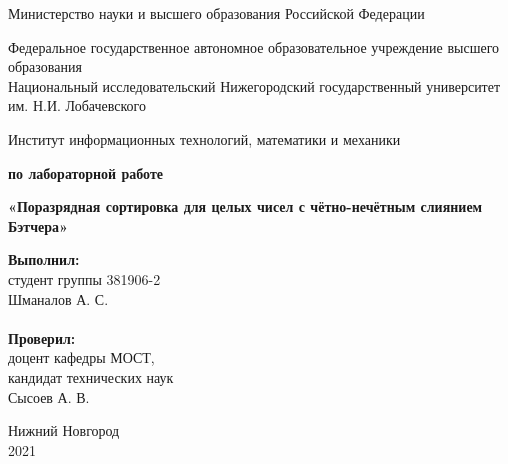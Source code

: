 \documentclass{report}
\begin{document}
\begin{titlepage}

\begin{center}
Министерство науки и высшего образования Российской Федерации
\end{center}

\begin{center}
Федеральное государственное автономное образовательное учреждение высшего образования \\
Национальный исследовательский Нижегородский государственный университет им. Н.И. Лобачевского
\end{center}

\begin{center}
Институт информационных технологий, математики и механики
\end{center}

\vspace{4em}

\begin{center}
\textbf{ по лабораторной работе} \\
\end{center}
\begin{center}
\textbf{\Large«Поразрядная сортировка для целых чисел с чётно-нечётным слиянием Бэтчера»} \\
\end{center}

\vspace{4em}

\newbox{\lbox}
\newlength{\maxl}
\setlength{\maxl}{\wd\lbox}
\hfill\parbox{7cm}{
\hspace*{5cm}\hspace*{-5cm}\textbf{Выполнил:} \\ студент группы 381906-2 \\ Шманалов А. С.\\
\\
\hspace*{5cm}\hspace*{-5cm}\textbf{Проверил:}\\ доцент кафедры МОСТ, \\ кандидат технических наук \\ Сысоев А. В.\\
}
\vspace{\fill}

\begin{center} Нижний Новгород \\ 2021 \end{center}

\end{titlepage}
\end{document}
